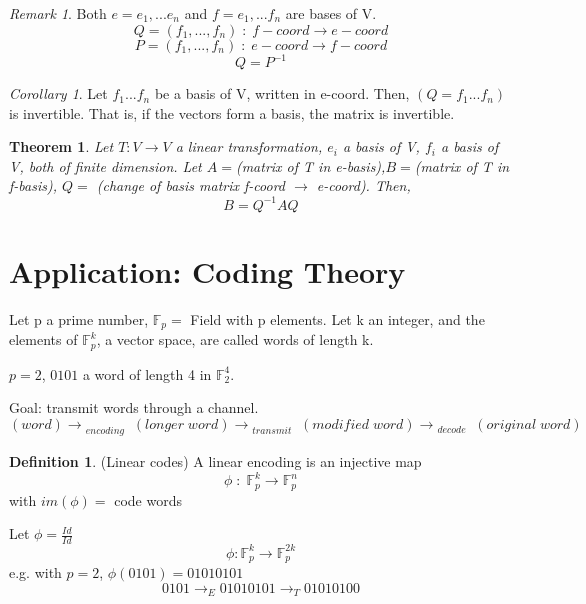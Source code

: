 \documentclass[12pt]{article}
\newtheorem{theorem}{Theorem}[section]
\theoremstyle{definition}
\newtheorem{definition}{Definition}[section]
\theoremstyle{remark}
\newtheorem*{remark}{Remark}
\newtheorem{corollary}{Corollary}[theorem]
\begin{document}
\begin{remark}
    Both $e= e_1, ... e_n $ and $f=  e_1, ... f_n $ are bases of V.
    $$Q = (f_1,..., f_n)\; :\; f-coord \rightarrow e- coord$$
    $$P = (f_1,..., f_n)\; :\; e-coord \rightarrow f- coord$$ 
    $$Q= P^{-1}$$
\end{remark}
\begin{corollary}
    Let $f_1 ... f_n$ be a basis of V, written in e-coord. Then, $(Q=f_1 ... f_n)$ is invertible. That is, if the vectors 
    form a basis, the matrix is invertible.   
\end{corollary}
\begin{theorem}
    Let $T : V\rightarrow V $ a linear transformation, $e_i$ a basis of V, $f_i$ a basis of V, both of finite dimension.
    Let $A=$(matrix of T in e-basis),$B=$(matrix of T in f-basis), 
    \newline $Q=$ (change of basis matrix f-coord $\rightarrow$ e-coord). 
    Then, $$B = Q^{-1}A Q$$
\end{theorem}
\section{Application: Coding Theory}
Let p a prime number, $\mathbb{F}_p =$ Field with p elements. Let k an integer, and the elements of $\mathbb{F}^k_p$, a vector space, are called words
of length k.  
\begin{example}
    $p=2$, $0101$ a word of length 4 in $\mathbb{F}^4_2$. 
    
    Goal: transmit words through a channel. $$(word)\rightarrow_{\substack{encoding}} (longer \; word)\rightarrow_{\substack{transmit}}(modified \; word)\rightarrow_{\substack{decode}}(original \; word)$$

\end{example}

\begin{definition}(Linear codes)
    A linear encoding is an injective map 
    $$\phi \; :\;\mathbb{F}^k_p \rightarrow \mathbb{F}^n_p$$
    with $im(\phi) =$ code words
\end{definition}

\begin{example}
    Let $\phi = \frac{Id}{Id}$
    $$\phi :\mathbb{F}^k_p \rightarrow \mathbb{F}^{2k}_p$$
    e.g. with $p=2$, $\phi(0101) = 01010101$
    $$0101 \rightarrow_E 01010101 \rightarrow_T 01010100$$
\end{example}
\end{document}
